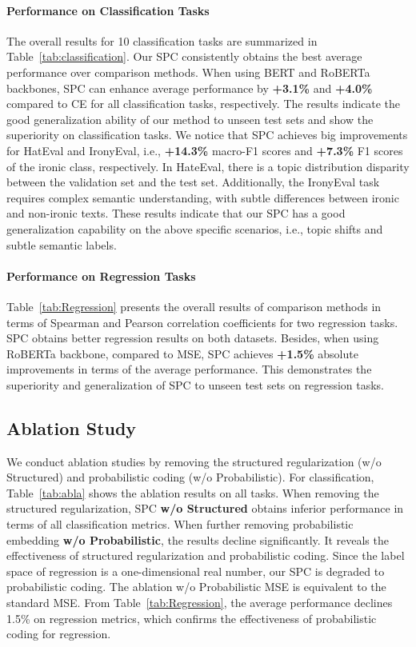 \documentclass[letterpaper]{article} %
\begin{document}
\paragraph{Performance on Classification Tasks}
The overall results for 10 classification tasks are summarized in Table~\ref{tab:classification}.
Our SPC consistently obtains the best average performance over comparison methods.
When using BERT and RoBERTa backbones, SPC can enhance average performance by \textbf{+3.1\%} and \textbf{+4.0\%} compared to CE for all classification tasks, respectively.
The results indicate the good generalization ability of our method to unseen test sets and show the superiority on classification tasks.
We notice that SPC achieves big improvements for HatEval and IronyEval, i.e., \textbf{+14.3\%} macro-F1 scores and \textbf{+7.3\%} F1 scores of the ironic class, respectively.
In HateEval, there is a topic distribution disparity between the validation set and the test set. Additionally, the IronyEval task requires complex semantic understanding, with subtle differences between ironic and non-ironic texts. These results indicate that our SPC has a good generalization capability on the above specific scenarios, i.e., topic shifts and subtle semantic labels.



\paragraph{Performance on Regression Tasks}
Table~\ref{tab:Regression} presents the overall results of comparison methods in terms of Spearman and Pearson correlation coefficients for two regression tasks.
SPC obtains better regression results on both datasets. Besides, when using RoBERTa backbone, compared to MSE, SPC achieves \textbf{+1.5\%} absolute improvements in terms of the average performance.
This demonstrates the superiority and generalization of SPC to unseen test sets on regression tasks.



\subsection{Ablation Study}
We conduct ablation studies by removing the structured regularization (w/o Structured) and probabilistic coding (w/o Probabilistic).
For classification, Table~\ref{tab:abla} shows the ablation results on all tasks.
When removing the structured regularization, SPC \textbf{w/o Structured} obtains inferior performance in terms of all classification metrics.
When further removing probabilistic embedding \textbf{w/o Probabilistic}, the results decline significantly. It reveals the effectiveness of structured regularization and probabilistic coding.
Since the label space of regression is a one-dimensional real number, our SPC is degraded to probabilistic coding. The ablation w/o Probabilistic MSE is equivalent to the standard MSE. From Table~\ref{tab:Regression}, the average performance declines 1.5\% on regression metrics, which confirms the effectiveness of probabilistic coding for regression.
\end{document}
